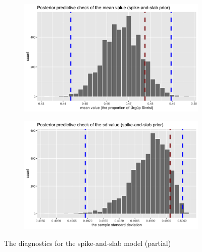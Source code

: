\documentclass[12pt]{article}
\begin{document}
\begin{figure}[ht]
    \begin{subfigure}[b]{0.45\textwidth}
        \centering
        \includegraphics[width=\linewidth]{figures/ppc_sas_mean.png}
        \label{fig:2c}
    \end{subfigure}
    \hfill
    \begin{subfigure}[b]{0.45\textwidth}
        \centering
        \includegraphics[width=\linewidth]{figures/ppc_sas_sd.png}
        \label{fig:2d}
        
    \end{subfigure}
    
    \caption{The diagnostics for the spike-and-slab model (partial)}
    \label{fig:mixing}
\end{figure}
\end{document}

